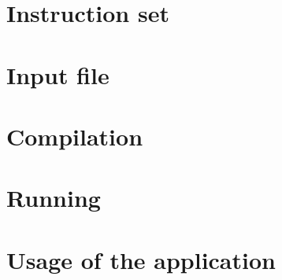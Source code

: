 \section{Instruction set}
	
	
\section{Input file}
	

\section{Compilation}

	
	
\section{Running}

	
	
\section{Usage of the application}

	